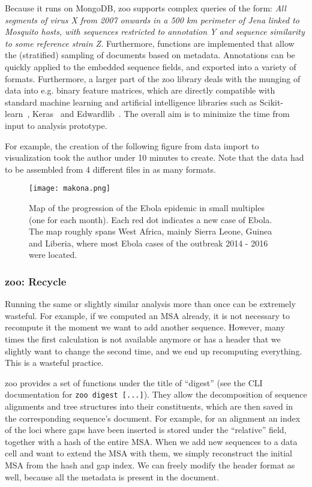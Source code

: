 Because it runs on MongoDB, zoo supports complex queries of the form: \emph{All segments of virus X from 2007 onwards in a 500 km perimeter of Jena linked to Mosquito hosts, with sequences restricted to annotation Y and sequence similarity to some reference strain Z.} Furthermore, functions are implemented that allow the (stratified) sampling of documents based on metadata. Annotations can be quickly applied to the embedded sequence fields, and exported into a variety of formats. Furthermore, a larger part of the zoo library deals with the munging of data into e.g. binary feature matrices, which are directly compatible with standard machine learning and artificial intelligence libraries such as Scikit-learn~\cite{Pedregosa2011-yy}, Keras~\cite{Chollet2015-km} and Edwardlib~\cite{Tran2017-mc}. The overall aim is to minimize the time from input to analysis prototype.

For example, the creation of the following figure from data import to visualization took the author under 10 minutes to create. Note that the data had to be assembled from 4 different files in as many formats.


\begin{figure}[H]
    \begin{center}\texttt{[image: makona.png]}\end{center}
    \caption[Map illustrating the spatio-temporal progression of the Ebola epidemic.]{Map of the progression of the Ebola epidemic in small multiples (one for each month). Each red dot indicates a new case of Ebola. The map roughly spans West Africa, mainly Sierra Leone, Guinea and Liberia, where most Ebola cases of the outbreak 2014 - 2016 were located.}
    \label{fig:makona}
\end{figure}


\subsubsection{zoo: Recycle}

Running the same or slightly similar analysis more than once can be extremely wasteful. For example, if we computed an MSA already, it is not necessary to recompute it the moment we want to add another sequence. However, many times the first calculation is not available anymore or has a header that we slightly want to change the second time, and we end up recomputing everything. This is a wasteful practice.

zoo provides a set of functions under the title of ``digest'' (see the CLI documentation for \colorbox{red-very-light}{\lstinline{zoo digest [...]}}). They allow the decomposition of sequence alignments and tree structures into their constituents, which are then saved in the corresponding sequence’s document. For example, for an alignment an index of the loci where gaps have been inserted is stored under the ``relative'' field, together with a hash of the entire MSA. When we add new sequences to a data cell and want to extend the MSA with them, we simply reconstruct the initial MSA from the hash and gap index. We can freely modify the header format as well, because all the metadata is present in the document.

